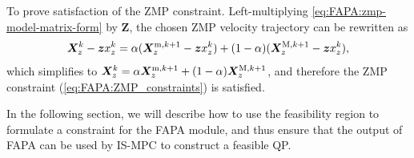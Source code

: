 To prove satisfaction of the ZMP constraint. Left-multiplying \eqref{eq:FAPA:zmp-model-matrix-form} by $\bm{Z}$, the chosen ZMP velocity trajectory can be rewritten as
\begin{equation*}
\bm{X}_z^k - \bm{z} x_z^k = \alpha (\bm{X}_z^{{\rm m}, k+1} - \bm{z} x_z^k) + (1-\alpha)(\bm{X}_z^{{\rm M}, k+1} - \bm{z} x_z^k),
\end{equation*}
which simplifies to
$\bm{X}_z^k = \alpha \bm{X}_z^{{\rm m}, k+1} + (1-\alpha)\bm{X}_z^{{\rm M}, k+1}$,
and therefore the ZMP constraint (\ref{eq:FAPA:ZMP_constraints}) is satisfied. \hfill\bull

In the following section, we will describe how to use the feasibility region to formulate a constraint for the FAPA module, and thus ensure that the output of FAPA can be used by IS-MPC to construct a feasible QP.
